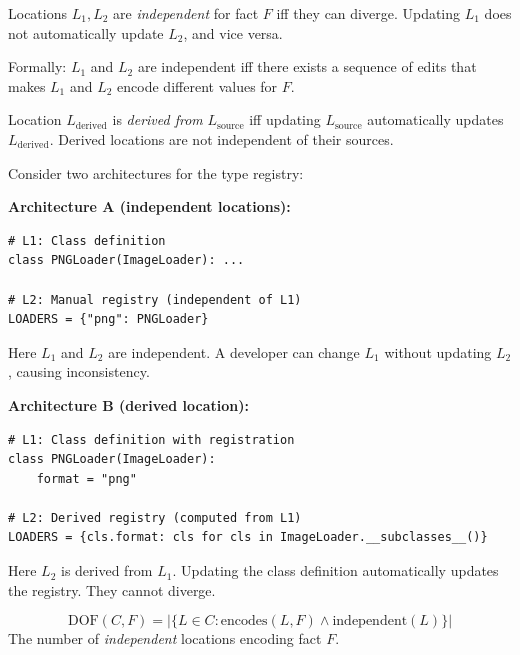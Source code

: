 \begin{definition}\label{def:independent}
Locations $L_1, L_2$ are \emph{independent} for fact $F$ iff they can diverge. Updating $L_1$ does not automatically update $L_2$, and vice versa.

Formally: $L_1$ and $L_2$ are independent iff there exists a sequence of edits that makes $L_1$ and $L_2$ encode different values for $F$.
\end{definition}

\begin{definition}\label{def:derived}
Location $L_{\text{derived}}$ is \emph{derived from} $L_{\text{source}}$ iff updating $L_{\text{source}}$ automatically updates $L_{\text{derived}}$. Derived locations are not independent of their sources.
\end{definition}

\begin{example}\label{ex:independence}
Consider two architectures for the type registry:

\textbf{Architecture A (independent locations):}
\begin{verbatim}
# L1: Class definition
class PNGLoader(ImageLoader): ...

# L2: Manual registry (independent of L1)
LOADERS = {"png": PNGLoader}
\end{verbatim}

Here $L_1$ and $L_2$ are independent. A developer can change $L_1$ without updating $L_2$, causing inconsistency.

\textbf{Architecture B (derived location):}
\begin{verbatim}
# L1: Class definition with registration
class PNGLoader(ImageLoader):
    format = "png"

# L2: Derived registry (computed from L1)
LOADERS = {cls.format: cls for cls in ImageLoader.__subclasses__()}
\end{verbatim}

Here $L_2$ is derived from $L_1$. Updating the class definition automatically updates the registry. They cannot diverge.
\end{example}

\begin{definition}\label{def:dof}
\[
\text{DOF}(C, F) = |\{L \in C : \text{encodes}(L, F) \land \text{independent}(L)\}|
\]
The number of \emph{independent} locations encoding fact $F$.
\end{definition}

